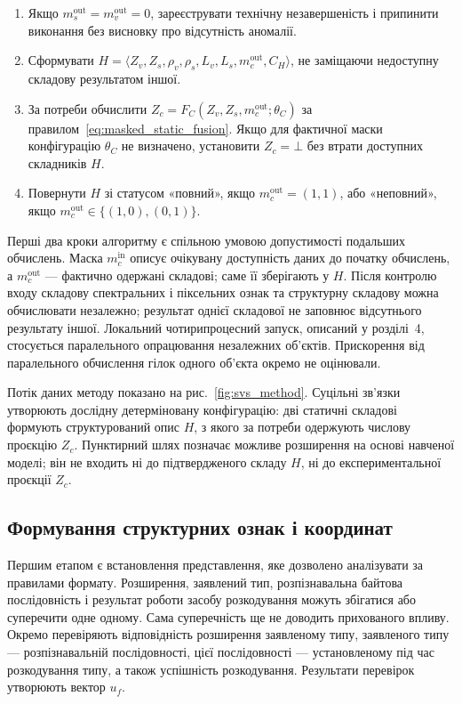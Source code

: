 \begin{algorithm}[H]
\begin{enumerate}[label=\arabic*.,leftmargin=6mm,itemsep=1pt,topsep=2pt]
\item Якщо $m_s^{\mathrm{out}}=m_v^{\mathrm{out}}=0$, зареєструвати технічну незавершеність і припинити виконання без висновку про відсутність аномалії.
\item Сформувати $H=\langle Z_v,Z_s,\rho_v,\rho_s,L_v,L_s,m_c^{\mathrm{out}},C_H\rangle$, не заміщаючи недоступну складову результатом іншої.
\item За потреби обчислити $Z_c=F_C(Z_v,Z_s,m_c^{\mathrm{out}};\theta_C)$ за правилом~\eqref{eq:masked_static_fusion}. Якщо для фактичної маски конфігурацію $\theta_C$ не визначено, установити $Z_c=\bot$ без втрати доступних складників $H$.
\item Повернути $H$ зі статусом «повний», якщо $m_c^{\mathrm{out}}=(1,1)$, або «неповний», якщо $m_c^{\mathrm{out}}\in\{(1,0),(0,1)\}$.
\end{enumerate}
\endgroup
\end{algorithm}

Перші два кроки алгоритму є спільною умовою допустимості подальших обчислень. Маска $m_c^{\mathrm{in}}$ описує очікувану доступність даних до початку обчислень, а $m_c^{\mathrm{out}}$ --- фактично одержані складові; саме її зберігають у $H$. Після контролю входу складову спектральних і піксельних ознак та структурну складову можна обчислювати незалежно; результат однієї складової не заповнює відсутнього результату іншої. Локальний чотирипроцесний запуск, описаний у розділі~4, стосується паралельного опрацювання незалежних об’єктів. Прискорення від паралельного обчислення гілок одного об’єкта окремо не оцінювали.

Потік даних методу показано на рис.~\ref{fig:svs_method}. Суцільні зв’язки утворюють дослідну детерміновану конфігурацію: дві статичні складові формують структурований опис $H$, з якого за потреби одержують числову проєкцію $Z_c$. Пунктирний шлях позначає можливе розширення на основі навченої моделі; він не входить ні до підтвердженого складу $H$, ні до експериментальної проєкції $Z_c$.



\subsection{Формування структурних ознак і координат}

Першим етапом є встановлення представлення, яке дозволено аналізувати за правилами формату. Розширення, заявлений тип, розпізнавальна байтова послідовність і результат роботи засобу розкодування можуть збігатися або суперечити одне одному. Сама суперечність ще не доводить прихованого впливу. Окремо перевіряють відповідність розширення заявленому типу, заявленого типу --- розпізнавальній послідовності, цієї послідовності --- установленому під час розкодування типу, а також успішність розкодування. Результати перевірок утворюють вектор $u_f$.

